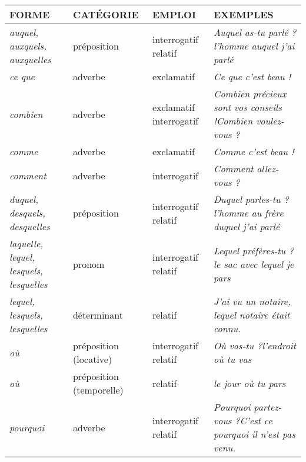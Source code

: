 \documentclass[UTF8]{report}
\begin{document}
\begin{table}[H]
\small
\centering
\begin{tabular}{|>{\RaggedRight\arraybackslash}p{2.5cm}|l|>{\RaggedRight\arraybackslash}p{2cm}|>{\RaggedRight\arraybackslash}p{6.5cm}|}
\hline
\rowcolor{cyan!20}
\textbf{FORME} & \textbf{CATÉGORIE} & \textbf{EMPLOI} & \textbf{EXEMPLES} \\
\hline
\textit{auquel, auxquels, auxquelles} & préposition & interrogatif \newline relatif & \textit{Auquel as-tu parlé ?}\newline\textit{l'homme auquel j'ai parlé} \\
\hline
\textit{ce que} & adverbe & exclamatif & \textit{Ce que c'est beau !} \\
\hline
\textit{combien} & adverbe & exclamatif \newline interrogatif & \textit{Combien précieux sont vos conseils !}\newline\textit{Combien voulez-vous ?} \\
\hline
\textit{comme} & adverbe & exclamatif & \textit{Comme c'est beau !} \\
\hline
\textit{comment} & adverbe & interrogatif & \textit{Comment allez-vous ?} \\
\hline
\textit{duquel, desquels, desquelles} & préposition & interrogatif \newline relatif & \textit{Duquel parles-tu ?}\newline\textit{l'homme au frère duquel j'ai parlé} \\
\hline
\textit{laquelle, lequel, lesquels, lesquelles} & pronom & interrogatif \newline relatif & \textit{Lequel préfères-tu ?}\newline\textit{le sac avec lequel je pars} \\
\hline
\textit{lequel, lesquels, lesquelles} & déterminant & relatif & \textit{J'ai vu un notaire, lequel notaire était connu.} \\
\hline
\textit{où} & préposition (locative) & interrogatif \newline relatif & \textit{Où vas-tu ?}\newline\textit{l'endroit où tu vas} \\
\hline
\textit{où} & préposition (temporelle) & relatif & \textit{le jour où tu pars} \\
\hline
\textit{pourquoi} & adverbe & interrogatif \newline relatif & \textit{Pourquoi partez-vous ?}\newline\textit{C'est ce pourquoi il n'est pas venu.} \\

\end{tabular}
\end{table}
\end{document}
